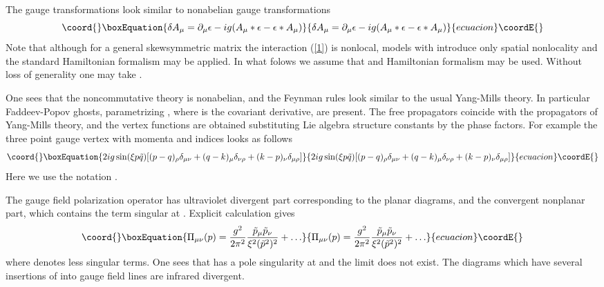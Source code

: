 \documentclass[a4paper,12pt]{article}
\begin{document}
 The gauge transformations look similar to nonabelian gauge
 transformations
 \begin{equation}\coord{}\boxEquation{
\delta A_{\mu}= \partial_{\mu} \epsilon-ig(A_{\mu}* \epsilon-
\epsilon* A_{\mu})
 \label{4}
 }{
\delta A_{\mu}= \partial_{\mu} \epsilon-ig(A_{\mu}* \epsilon-
\epsilon* A_{\mu})
 }{ecuacion}\coordE{}\end{equation}
Note that although for a general skewsymmetric matrix \myHighlight{$\theta_{\mu \nu}$}\coordHE{}
the interaction (\ref{1}) is nonlocal, models with \coordHE{}
 introduce only spatial nonlocality and the standard Hamiltonian formalism
 may be applied. In what folows we assume that \coordHE{} and
 Hamiltonian formalism may be used. Without loss of generality one
 may take \coordHE{}.

One sees that the \coordHE{} noncommutative theory is nonabelian, and the
 Feynman rules look similar to the usual Yang-Mills theory. In particular
 Faddeev-Popov ghosts, parametrizing \coordHE{}, where
 \coordHE{} is the covariant derivative, are present. The free propagators
 coincide with the propagators of Yang-Mills theory, and the vertex
 functions are obtained substituting Lie algebra structure
 constants by the phase factors. For example the three point gauge vertex
 with momenta \coordHE{} and indices \myHighlight{$\mu, \nu, \rho$}\coordHE{} looks as follows
 \begin{equation}\coord{}\boxEquation{
 2ig \sin(\xi p \tilde{q})[(p-q)_{\rho} \delta_{\mu
 \nu}+(q-k)_{\mu} \delta_{\nu \rho}+(k-p)_{\nu} \delta_{\mu \rho}]
 \label{5}
 }{
 2ig \sin(\xi p \tilde{q})[(p-q)_{\rho} \delta_{\mu
 \nu}+(q-k)_{\mu} \delta_{\nu \rho}+(k-p)_{\nu} \delta_{\mu \rho}]
 }{ecuacion}\coordE{}\end{equation}
 Here we use the notation \coordHE{}.

 The gauge field polarization operator has ultraviolet divergent part
 corresponding to the planar diagrams, and the convergent nonplanar
 part, which contains the term singular at \coordHE{}. Explicit calculation
 gives \begin{equation}\coord{}\boxEquation{ \Pi_{\mu \nu}(p)= \frac{g^2}{2 \pi^2}
 \frac{\tilde{p}_{\mu}\tilde{p}_{\nu}}{\xi^2(\tilde{p}^2)^2}+ \ldots
 \label{6} }{ \Pi_{\mu \nu}(p)= \frac{g^2}{2 \pi^2}
 \frac{\tilde{p}_{\mu}\tilde{p}_{\nu}}{\xi^2(\tilde{p}^2)^2}+ \ldots
 }{ecuacion}\coordE{}\end{equation}
 where \myHighlight{$\ldots$}\coordHE{} denotes less singular terms. One sees that \myHighlight{$\Pi_{\mu \nu}$}\coordHE{}
 has a pole singularity at \coordHE{} and the limit
 \coordHE{} does not exist. The diagrams which have several
 insertions of \myHighlight{$\Pi_{\mu \nu}$}\coordHE{} into gauge field lines are infrared
 divergent.
\end{document}
